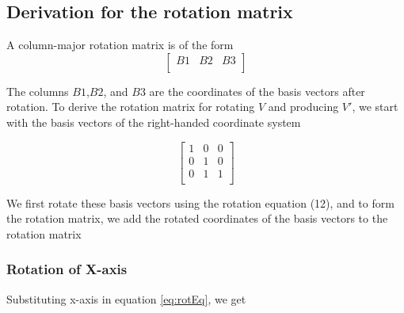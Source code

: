 \documentclass{article}
\begin{document}
    \subsection*{Derivation for the rotation matrix}

    A column-major rotation matrix is of the form
    \[
        \begin{bmatrix}
            B1 & B2 & B3 \\
        \end{bmatrix}
    \]

    The columns $B1$,$B2$, and $B3$ are the coordinates of the basis vectors after rotation. To derive the rotation matrix for rotating $V$ and producing $V'$, we start with the basis vectors of the right-handed coordinate system

    \[
        \begin{bmatrix}
            1 & 0 & 0 \\
            0 & 1 & 0 \\
            0 & 1 & 1 \\
        \end{bmatrix}
    \]

    We first rotate these basis vectors using the rotation equation (12), and to form the rotation matrix, we add the rotated coordinates of the basis vectors to the rotation matrix

    \subsubsection*{Rotation of X-axis}

    Substituting x-axis in equation \ref{eq:rotEq}, we get
\end{document}
